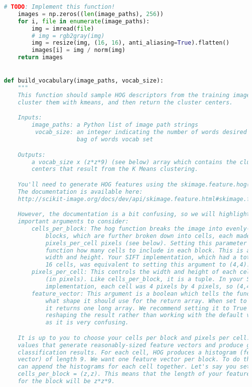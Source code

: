 \begin{lstlisting}[caption={student.py}, label={l:code-example}, captionpos=t, language=python]
    # TODO: Implement this function!
    images = np.zeros((len(image_paths), 256))
    for i, file in enumerate(image_paths):
        img = imread(file)
        # img = rgb2gray(img)
        img = resize(img, (16, 16), anti_aliasing=True).flatten()
        images[i] = img / norm(img)
    return images


def build_vocabulary(image_paths, vocab_size):
    """
    This function should sample HOG descriptors from the training images,
    cluster them with kmeans, and then return the cluster centers.

    Inputs:
        image_paths: a Python list of image path strings
         vocab_size: an integer indicating the number of words desired for the
                     bag of words vocab set

    Outputs:
        a vocab_size x (z*z*9) (see below) array which contains the cluster
        centers that result from the K Means clustering.

    You'll need to generate HOG features using the skimage.feature.hog() function.
    The documentation is available here:
    http://scikit-image.org/docs/dev/api/skimage.feature.html#skimage.feature.hog

    However, the documentation is a bit confusing, so we will highlight some
    important arguments to consider:
        cells_per_block: The hog function breaks the image into evenly-sized
            blocks, which are further broken down into cells, each made of
            pixels_per_cell pixels (see below). Setting this parameter tells the
            function how many cells to include in each block. This is a tuple of
            width and height. Your SIFT implementation, which had a total of
            16 cells, was equivalent to setting this argument to (4,4).
        pixels_per_cell: This controls the width and height of each cell
            (in pixels). Like cells_per_block, it is a tuple. In your SIFT
            implementation, each cell was 4 pixels by 4 pixels, so (4,4).
        feature_vector: This argument is a boolean which tells the function
            what shape it should use for the return array. When set to True,
            it returns one long array. We recommend setting it to True and
            reshaping the result rather than working with the default value,
            as it is very confusing.

    It is up to you to choose your cells per block and pixels per cell. Choose
    values that generate reasonably-sized feature vectors and produce good
    classification results. For each cell, HOG produces a histogram (feature
    vector) of length 9. We want one feature vector per block. To do this we
    can append the histograms for each cell together. Let's say you set
    cells_per_block = (z,z). This means that the length of your feature vector
    for the block will be z*z*9.


\end{lstlisting}
